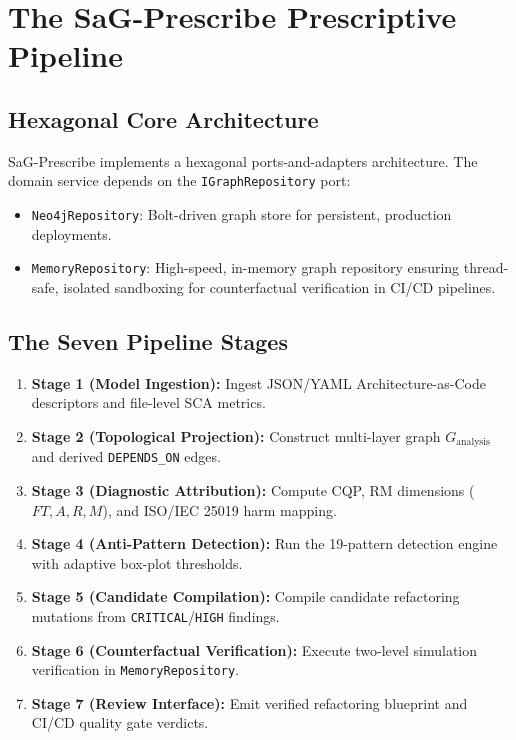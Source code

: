 \section{The SaG-Prescribe Prescriptive Pipeline}
\label{sec:prescriptive_pipeline}

\subsection{Hexagonal Core Architecture}
\label{sec:prescribe:hexagonal}

SaG-Prescribe implements a hexagonal ports-and-adapters architecture. The domain service depends on the \texttt{IGraphRepository} port:
\begin{itemize}
    \item \texttt{Neo4jRepository}: Bolt-driven graph store for persistent, production deployments.
    \item \texttt{MemoryRepository}: High-speed, in-memory graph repository ensuring thread-safe, isolated sandboxing for counterfactual verification in CI/CD pipelines.
\end{itemize}

\subsection{The Seven Pipeline Stages}
\label{sec:prescribe:stages}

\begin{enumerate}
    \item \textbf{Stage 1 (Model Ingestion):} Ingest JSON/YAML Architecture-as-Code descriptors and file-level SCA metrics.
    \item \textbf{Stage 2 (Topological Projection):} Construct multi-layer graph $G_{\text{analysis}}$ and derived \texttt{DEPENDS\_ON} edges.
    \item \textbf{Stage 3 (Diagnostic Attribution):} Compute CQP, RM dimensions ($FT, A, R, M$), and ISO/IEC 25019 harm mapping.
    \item \textbf{Stage 4 (Anti-Pattern Detection):} Run the 19-pattern detection engine with adaptive box-plot thresholds.
    \item \textbf{Stage 5 (Candidate Compilation):} Compile candidate refactoring mutations from \texttt{CRITICAL}/\texttt{HIGH} findings.
    \item \textbf{Stage 6 (Counterfactual Verification):} Execute two-level simulation verification in \texttt{MemoryRepository}.
    \item \textbf{Stage 7 (Review Interface):} Emit verified refactoring blueprint and CI/CD quality gate verdicts.
\end{enumerate}


